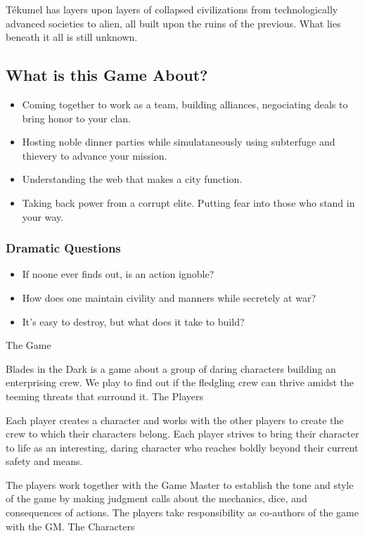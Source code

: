 Tékumel has layers upon layers of collapsed civilizations from technologically advanced societies to alien, all built upon the ruins of the previous. What lies beneath it all is still unknown. 


\subsection{What is this Game About?}

\begin{itemize}
\item Coming together to work as a team, building alliances, negociating deals to bring honor to your clan.
\item Hosting noble dinner parties while simulataneously using subterfuge and thievery to advance your mission.
\item Understanding the web that makes a city function.
\item Taking back power from a corrupt elite. Putting fear into those who stand in your way.
\end{itemize}

\subsubsection{Dramatic Questions}

\begin{itemize}
\item If noone ever finds out, is an action ignoble?
\item How does one maintain civility and manners while secretely at war?
\item It's easy to destroy, but what does it take to build?
\end{itemize}

The Game

Blades in the Dark is a game about a group of daring characters building an enterprising crew. We play to find out if the fledgling crew can thrive amidst the teeming threats that surround it.
The Players

Each player creates a character and works with the other players to create the crew to which their characters belong. Each player strives to bring their character to life as an interesting, daring character who reaches boldly beyond their current safety and means.

The players work together with the Game Master to establish the tone and style of the game by making judgment calls about the mechanics, dice, and consequences of actions. The players take responsibility as co-authors of the game with the GM.
The Characters

